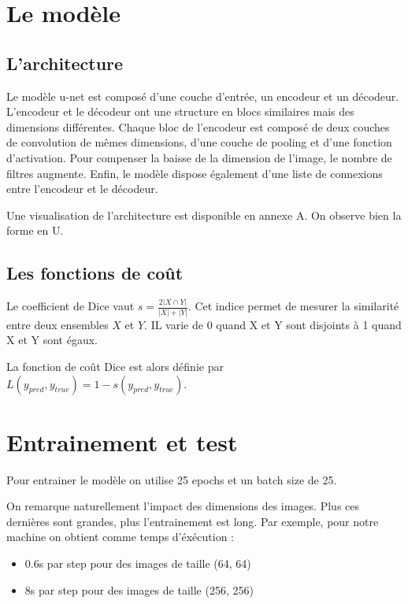 \documentclass[12pt,a4paper,titlepage]{article}
\begin{document}
\section{Le modèle}

\subsection{L'architecture}

Le modèle u-net est composé d'une couche d'entrée, un encodeur et un décodeur.
L'encodeur et le décodeur ont une structure en blocs similaires mais des dimensions différentes.
Chaque bloc de l'encodeur est composé de deux couches de convolution de mêmes dimensions,
d'une couche de pooling et d'une fonction d'activation. Pour compenser la baisse de la
dimension de l'image, le nombre de filtres augmente. Enfin, le modèle dispose également d'une
liste de connexions entre l'encodeur et le décodeur.

Une visualisation de l'architecture est disponible en annexe A. On observe bien la forme en U.

\subsection{Les fonctions de coût}

Le coefficient de Dice vaut $s = \frac{2 \lvert X \cap Y \rvert}{\lvert X \rvert + \lvert Y \rvert}$.
Cet indice permet de mesurer la similarité entre deux ensembles $X$ et $Y$. IL varie de
0 quand X et Y sont disjoints à 1 quand X et Y sont égaux.

La fonction de coût Dice est alors définie par $L(y_{pred}, y_{true}) = 1 - s(y_{pred}, y_{true})$.

\section{Entrainement et test}

Pour entrainer le modèle on utilise 25 epochs et un batch size de 25.

On remarque naturellement l'impact des dimensions des images. Plus ces dernières sont
grandes, plus l'entrainement est long. Par exemple, pour notre machine on obtient comme temps
d'éxécution :

\begin{itemize}
    \item{0.6s par step pour des images de taille (64, 64)}
    \item{8s par step pour des images de taille (256, 256)}
\end{itemize}
\end{document}
